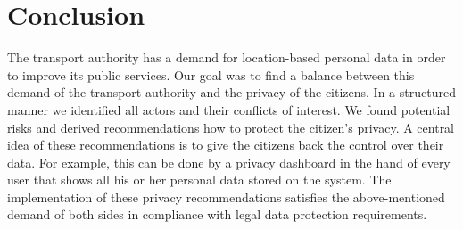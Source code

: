 \documentclass[runningheads,a4paper]{llncs}
\begin{document}




\section{Conclusion}

The transport authority has a demand for location-based personal data in order to improve its public services. Our goal was to find a balance between this demand of the transport authority and the privacy of the citizens. In a structured manner we identified all actors and their conflicts of interest. We found potential risks and derived recommendations how to protect the citizen's privacy. A central idea of these recommendations is to give the citizens back the control over their data. For example, this can be done by a privacy dashboard in the hand of every user that shows all his or her personal data stored on the system. The implementation of these privacy recommendations satisfies the above-mentioned demand of both sides in compliance with legal data protection requirements.



{}
\end{document}
